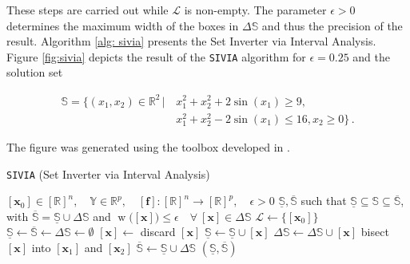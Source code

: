 \noindent
These steps are carried out while $\mathcal{L}$ is non-empty. The parameter $\epsilon > 0$ determines the maximum width of the boxes in  $\Delta\mathbb{S}$ and thus the precision of the result. Algorithm \ref{alg: sivia} presents the Set Inverter via Interval Analysis. Figure \ref{fig:sivia} depicts the result of the \texttt{SIVIA} algorithm for $\epsilon = 0.25$ and the solution set 

\begin{equation}\label{eq:solution_set_example}
\begin{split}
\mathbb{S} = \big\{ (x_1, x_2) \in \mathbb{R}^2\,|\,&x_1^2 + x_2^2 + 2 \sin(x_1) \geq 9, \\
&x_1^2 + x_2^2 - 2 \sin(x_1) \leq 16, x_2 \geq 0 \big\}\,.
\end{split}
\end{equation}

\noindent
The figure was generated using the toolbox developed in \cite{garajova2016solving}.


\begin{algorithm*}[h]
\caption[Set Inverter via Interval Analysis (\texttt{SIVIA})]{\texttt{SIVIA} (Set Inverter via Interval Analysis) \cite{jaulin2001applied}}
\label{alg: sivia}
\begin{algorithmic}[1]
\Require $[\bm{x}_0] \in [\mathbb{R}]^n, \quad \mathbb{Y} \in \mathbb{R}^p, \quad [\bm{f}]: [\mathbb{R}]^n \rightarrow [\mathbb{R}]^p, \quad \epsilon > 0$
\Ensure $\underline{\mathbb{S}}, \overline{\mathbb{S}}$ such that $\underline{\mathbb{S}} \subseteq \mathbb{S} \subseteq \overline{\mathbb{S}}$, with $\overline{\mathbb{S}} = \underline{\mathbb{S}} \cup \Delta\mathbb{S}$ and $\operatorname{w}\big([\bm{x}]\big) \leq \epsilon \quad \forall\: [\bm{x}] \in \Delta\mathbb{S}$
\Statex
{}
\State $\mathcal{L} \gets \big\{[\bm{x}_0]\big\}$
\State $\underline{\mathbb{S}} \gets \overline{\mathbb{S}} \gets \Delta\mathbb{S} \gets \emptyset$
\State $[\bm{x}] \gets$  
 
    \State discard $[\bm{x}]$ 
 
	\State $\underline{\mathbb{S}} \gets \underline{\mathbb{S}} \cup [\bm{x}]$ 
 
	\State $\Delta\mathbb{S} \gets \Delta\mathbb{S} \cup [\bm{x}]$ 
\Else   {}
\State  bisect $[\bm{x}]$ into $[\bm{x}_1]$ and $[\bm{x}_2]$
\State {}
\State {}
 \EndIf
\EndWhile
\State $\overline{\mathbb{S}} \gets \underline{\mathbb{S}} \cup \Delta\mathbb{S}$
\State \Return $(\underline{\mathbb{S}}, \overline{\mathbb{S}})$ 
\EndFunction
\end{algorithmic}
\end{algorithm*}




